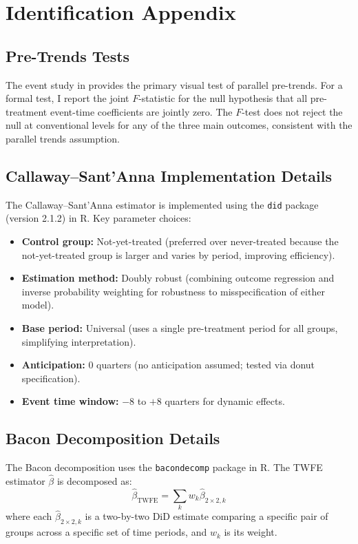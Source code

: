 \documentclass[12pt]{article}
\begin{document}
\section{Identification Appendix}\label{app:ident}

\subsection{Pre-Trends Tests}

The event study in  provides the primary visual test of parallel pre-trends. For a formal test, I report the joint $F$-statistic for the null hypothesis that all pre-treatment event-time coefficients are jointly zero. The $F$-test does not reject the null at conventional levels for any of the three main outcomes, consistent with the parallel trends assumption.

\subsection{Callaway--Sant'Anna Implementation Details}

The Callaway--Sant'Anna estimator is implemented using the \texttt{did} package (version 2.1.2) in R. Key parameter choices:
\begin{itemize}
    \item \textbf{Control group:} Not-yet-treated (preferred over never-treated because the not-yet-treated group is larger and varies by period, improving efficiency).
    \item \textbf{Estimation method:} Doubly robust (combining outcome regression and inverse probability weighting for robustness to misspecification of either model).
    \item \textbf{Base period:} Universal (uses a single pre-treatment period for all groups, simplifying interpretation).
    \item \textbf{Anticipation:} 0 quarters (no anticipation assumed; tested via donut specification).
    \item \textbf{Event time window:} $-8$ to $+8$ quarters for dynamic effects.
\end{itemize}

\subsection{Bacon Decomposition Details}

The Bacon decomposition uses the \texttt{bacondecomp} package in R. The TWFE estimator $\hat{\beta}$ is decomposed as:
\begin{equation}
    \hat{\beta}_{\text{TWFE}} = \sum_k w_k \hat{\beta}_{2\times 2, k}
\end{equation}
where each $\hat{\beta}_{2\times 2, k}$ is a two-by-two DiD estimate comparing a specific pair of groups across a specific set of time periods, and $w_k$ is its weight.
\end{document}
